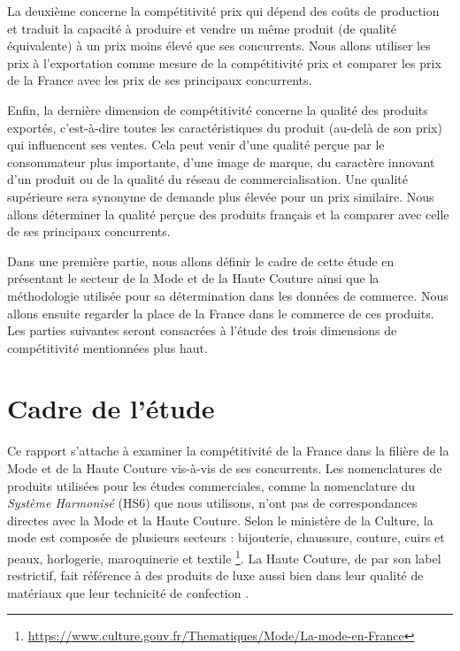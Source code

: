 \documentclass[french,10pt,a4paper]{article}
\begin{document}
La deuxième concerne la compétitivité prix qui dépend des coûts de production et traduit la capacité à produire et vendre un même produit (de qualité équivalente) à un prix moins élevé que ses concurrents. Nous allons utiliser les prix à l'exportation comme mesure de la compétitivité prix et comparer les prix de la France avec les prix de ses principaux concurrents.

Enfin, la dernière dimension de compétitivité concerne la qualité des produits exportés, c'est-à-dire toutes les caractéristiques du produit (au-delà de son prix) qui influencent ses ventes. Cela peut venir d'une qualité perçue par le consommateur plus importante, d'une image de marque, du caractère innovant d'un produit ou de la qualité du réseau de commercialisation. Une qualité supérieure sera synonyme de demande plus élevée pour un prix similaire. Nous allons déterminer la qualité perçue des produits français et la comparer avec celle de ses principaux concurrents.

\bigskip

Dans une première partie, nous allons définir le cadre de cette étude en présentant le secteur de la Mode et de la Haute Couture ainsi que la méthodologie utilisée pour sa détermination dans les données de commerce. Nous allons ensuite regarder la place de la France dans le commerce de ces produits. Les parties suivantes seront consacrées à l'étude des trois dimensions de compétitivité mentionnées plus haut.


\newpage

\section{Cadre de l'étude}

Ce rapport s'attache à examiner la compétitivité de la France dans la filière de la Mode et de la Haute Couture vis-à-vis de ses concurrents. Les nomenclatures de produits utilisées pour les études commerciales, comme la nomenclature du \textit{Système Harmonisé} (HS6) que nous utilisons, n'ont pas de correspondances directes avec la Mode et la Haute Couture. Selon le ministère de la Culture, la mode est composée de plusieurs secteurs : bijouterie, chaussure, couture, cuirs et peaux, horlogerie, maroquinerie et textile \footnote{\href{https://www.culture.gouv.fr/Thematiques/Mode/La-mode-en-France}{https://www.culture.gouv.fr/Thematiques/Mode/La-mode-en-France}}. La Haute Couture, de par son label restrictif, fait référence à des produits de luxe aussi bien dans leur qualité de matériaux que leur technicité de confection \citep{Agogue2010}. 
\end{document}
